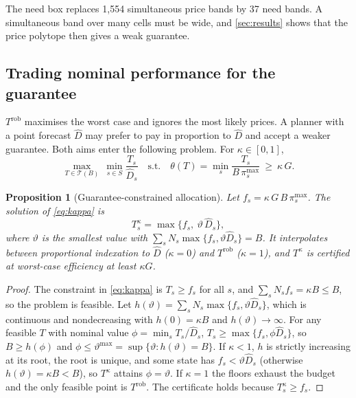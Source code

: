 \documentclass[preprint,12pt,number]{elsarticle}%
\newtheorem{proposition}{Proposition}
\theoremstyle{definition}
\theoremstyle{remark}
\newcommand{\pimax}{\pi^{\max}}
\begin{document}
The need box replaces 1{,}554 simultaneous price bands by 37 need bands. A simultaneous band over many cells must be wide, and \cref{sec:results} shows that the price polytope then gives a weak guarantee.

\subsection{Trading nominal performance for the guarantee}\label{sec:frontier}

$T^{\mathrm{rob}}$ maximises the worst case and ignores the most likely prices. A planner with a point forecast $\hat D$ may prefer to pay in proportion to $\hat D$ and accept a weaker guarantee. Both aims enter the following problem. For $\kappa\in[0,1]$,
\begin{equation}\label{eq:kappa}
\max_{T\in\mathcal T(B)}\ \min_{s\in S}\frac{T_s}{\hat D_s}\quad\text{s.t.}\quad\theta(T)=\min_{s}\frac{T_s}{B\,\pimax_s}\ \ge\ \kappa\,G .
\end{equation}

\begin{proposition}[Guarantee-constrained allocation]\label{prop:kappa}
Let $f_s=\kappa\,G\,B\,\pimax_s$. The solution of \eqref{eq:kappa} is
\begin{equation}\label{eq:waterfill}
T^{\kappa}_s=\max\{f_s,\ \vartheta\,\hat D_s\},
\end{equation}
where $\vartheta$ is the smallest value with $\sum_sN_s\max\{f_s,\vartheta\hat D_s\}=B$. It interpolates between proportional indexation to $\hat D$ ($\kappa=0$) and $T^{\mathrm{rob}}$ ($\kappa=1$), and $T^{\kappa}$ is certified at worst-case efficiency at least $\kappa G$.
\end{proposition}

\begin{proof}
The constraint in \eqref{eq:kappa} is $T_s\ge f_s$ for all $s$, and $\sum_sN_sf_s=\kappa B\le B$, so the problem is feasible. Let $h(\vartheta)=\sum_sN_s\max\{f_s,\vartheta\hat D_s\}$, which is continuous and nondecreasing with $h(0)=\kappa B$ and $h(\vartheta)\to\infty$. For any feasible $T$ with nominal value $\phi=\min_sT_s/\hat D_s$, $T_s\ge\max\{f_s,\phi\hat D_s\}$, so $B\ge h(\phi)$ and $\phi\le\vartheta^{\max}=\sup\{\vartheta: h(\vartheta)=B\}$. If $\kappa<1$, $h$ is strictly increasing at its root, the root is unique, and some state has $f_s<\vartheta\hat D_s$ (otherwise $h(\vartheta)=\kappa B<B$), so $T^\kappa$ attains $\phi=\vartheta$. If $\kappa=1$ the floors exhaust the budget and the only feasible point is $T^{\mathrm{rob}}$. The certificate holds because $T^{\kappa}_s\ge f_s$.
\end{proof}
\end{document}
